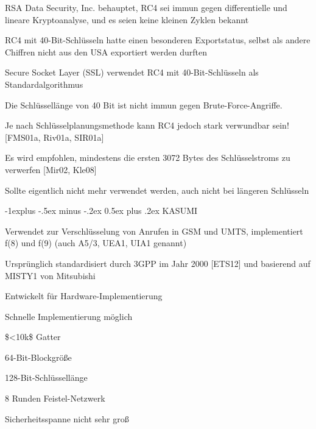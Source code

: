 \documentclass[a4paper]{article}
\makeatletter
\renewcommand{\subsection}{\@startsection{subsection}{2}{0mm}%
 {-1explus -.5ex minus -.2ex}%
 {0.5ex plus .2ex}%
 {\normalfont\normalsize\bfseries}}
\makeatother
\begin{document}
\begin{multicols}{3}
\begin{itemize*}
\begin{itemize*}
                  \item RSA Data Security, Inc. behauptet, RC4 sei immun gegen differentielle und lineare Kryptoanalyse, und es seien keine kleinen Zyklen bekannt
            \end{itemize*}
            \item RC4 mit 40-Bit-Schlüsseln hatte einen besonderen Exportstatus, selbst
            als andere Chiffren nicht aus den USA exportiert werden durften
            \begin{itemize*}
                  \item Secure Socket Layer (SSL) verwendet RC4 mit 40-Bit-Schlüsseln als Standardalgorithmus
                  \item Die Schlüssellänge von 40 Bit ist nicht immun gegen Brute-Force-Angriffe.
            \end{itemize*}
            \item Je nach Schlüsselplanungsmethode kann RC4 jedoch stark verwundbar
            sein! {[}FMS01a, Riv01a, SIR01a{]}
            \item Es wird empfohlen, mindestens die ersten 3072 Bytes des
            Schlüsselstroms zu verwerfen {[}Mir02, Kle08{]}
            \item Sollte eigentlich nicht mehr verwendet werden, auch nicht bei längeren
            Schlüsseln
      \end{itemize*}


      \subsection{KASUMI}

      \begin{itemize*}
            \item Verwendet zur Verschlüsselung von Anrufen in GSM und UMTS,
            implementiert f(8) und f(9) (auch A5/3, UEA1, UIA1 genannt)
            \item Ursprünglich standardisiert durch 3GPP im Jahr 2000 {[}ETS12{]} und
            basierend auf MISTY1 von Mitsubishi
            \item Entwickelt für Hardware-Implementierung
            \begin{itemize*}
                  \item Schnelle Implementierung möglich
                  \item \$\textless10k\$ Gatter
            \end{itemize*}
            \item 64-Bit-Blockgröße
            \item 128-Bit-Schlüssellänge
            \item 8 Runden Feistel-Netzwerk
            \item Sicherheitsspanne nicht sehr groß
      \end{itemize*}


\end{multicols}
\end{document}
